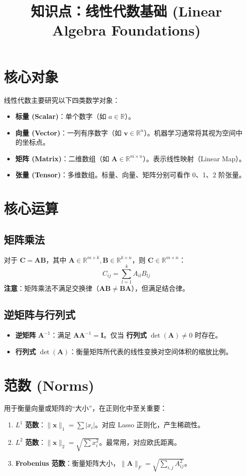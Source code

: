 \documentclass[12pt, a4paper]{article}
\title{知识点：线性代数基础 (Linear Algebra Foundations)}
\author{}
\date{}
\begin{document}
\maketitle

\section{核心对象}
线性代数主要研究以下四类数学对象：
\begin{itemize}
    \item \textbf{标量 (Scalar)}：单个数字（如 $a \in \mathbb{R}$）。
    \item \textbf{向量 (Vector)}：一列有序数字（如 $\mathbf{v} \in \mathbb{R}^n$）。机器学习通常将其视为空间中的坐标点。
    \item \textbf{矩阵 (Matrix)}：二维数组（如 $\mathbf{A} \in \mathbb{R}^{m \times n}$）。表示线性映射（Linear Map）。
    \item \textbf{张量 (Tensor)}：多维数组。标量、向量、矩阵分别可看作 0、1、2 阶张量。
\end{itemize}

\section{核心运算}

\subsection{矩阵乘法}
对于 $\mathbf{C} = \mathbf{AB}$，其中 $\mathbf{A} \in \mathbb{R}^{m \times k}, \mathbf{B} \in \mathbb{R}^{k \times n}$，则 $\mathbf{C} \in \mathbb{R}^{m \times n}$：
$$ C_{ij} = \sum_{l=1}^k A_{il} B_{lj} $$
\textbf{注意}：矩阵乘法不满足交换律（$\mathbf{AB} \ne \mathbf{BA}$），但满足结合律。

\subsection{逆矩阵与行列式}
\begin{itemize}
    \item \textbf{逆矩阵} $\mathbf{A}^{-1}$：满足 $\mathbf{A} \mathbf{A}^{-1} = \mathbf{I}$。仅当 \textbf{行列式} $\det(\mathbf{A}) \ne 0$ 时存在。
    \item \textbf{行列式} $\det(\mathbf{A})$：衡量矩阵所代表的线性变换对空间体积的缩放比例。
\end{itemize}

\section{范数 (Norms)}
用于衡量向量或矩阵的“大小”，在正则化中至关重要：
\begin{enumerate}
    \item $L^1$ \textbf{范数}：$\|\mathbf{x}\|_1 = \sum |x_i|$。对应 Lasso 正则化，产生稀疏性。
    \item $L^2$ \textbf{范数}：$\|\mathbf{x}\|_2 = \sqrt{\sum x_i^2}$。最常用，对应欧氏距离。
    \item \textbf{Frobenius 范数}：衡量矩阵大小，$\|\mathbf{A}\|_F = \sqrt{\sum_{i,j} A_{ij}^2}$。
\end{enumerate}
\end{document}
